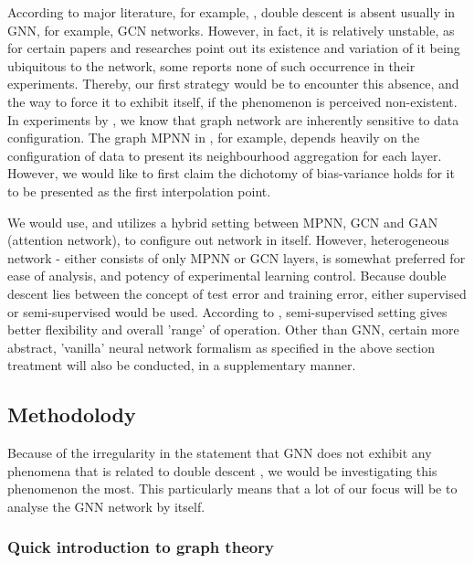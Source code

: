 \documentclass[10pt,oneside,oldfontcommands,dvipsnames,article]{memoir}
\begin{document}
According to major literature, for example, \cite{shi2024homophilymodulatesdoubledescent}, double descent is absent usually in GNN, for example, GCN networks. However, in fact, it is relatively unstable, as for certain papers and researches point out its existence and variation of it being ubiquitous to the network, some reports none of such occurrence in their experiments. Thereby, our first strategy would be to encounter this absence, and the way to force it to exhibit itself, if the phenomenon is perceived non-existent. In experiments by \cite{shi2024homophilymodulatesdoubledescent,buschjager_generalized_2020}, we know that graph network are inherently sensitive to data configuration. The graph MPNN in \cite{GRP_Hamilton}, for example, depends heavily on the configuration of data to present its neighbourhood aggregation for each layer. However, we would like to first claim the dichotomy of bias-variance holds for it to be presented as the first interpolation point.

We would use, and utilizes a hybrid setting between MPNN, GCN and GAN (attention network), to configure out network in itself. However, heterogeneous network - either consists of only MPNN or GCN layers, is somewhat preferred for ease of analysis, and potency of experimental learning control. Because double descent lies between the concept of test error and training error, either supervised or semi-supervised would be used. According to \cite{shi2024homophilymodulatesdoubledescent}, semi-supervised setting gives better flexibility and overall 'range' of operation. Other than GNN, certain more abstract, 'vanilla' neural network formalism as specified in the above section treatment will also be conducted, in a supplementary manner. 

\subsection{Methodolody}

Because of the irregularity in the statement that GNN does not exhibit any phenomena that is related to double descent \cite{shi2024homophilymodulatesdoubledescent}, we would be investigating this phenomenon the most. This particularly means that a lot of our focus will be to analyse the GNN network by itself. 

\subsubsection{Quick introduction to graph theory}
\end{document}
